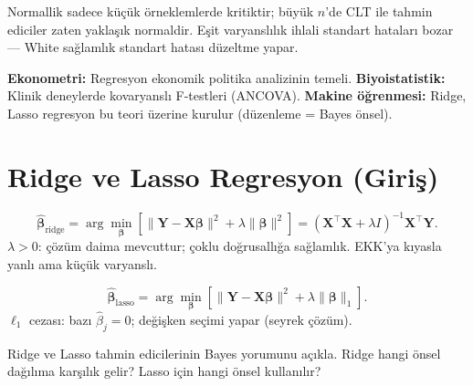 \begin{hataanalizi}
Normallik sadece küçük örneklemlerde kritiktir; büyük $n$'de CLT ile tahmin ediciler zaten yaklaşık normaldir. Eşit varyanslılık ihlali standart hataları bozar --- White sağlamlık standart hatası düzeltme yapar.
\end{hataanalizi}

\begin{disiplinlerarasibaglan}
\textbf{Ekonometri:} Regresyon ekonomik politika analizinin temeli. \textbf{Biyoistatistik:} Klinik deneylerde kovaryanslı F-testleri (ANCOVA). \textbf{Makine öğrenmesi:} Ridge, Lasso regresyon bu teori üzerine kurulur (düzenleme = Bayes önsel).
\end{disiplinlerarasibaglan}

\section{Ridge ve Lasso Regresyon (Giriş)}
\label{sec:ridge_lasso}

\begin{tanim}\label{def:ridge}
\[
  \hat{\boldsymbol{\beta}}_{\mathrm{ridge}} = \arg\min_{\boldsymbol\beta}\left[\|\mathbf{Y}-\mathbf{X}\boldsymbol\beta\|^2 + \lambda\|\boldsymbol\beta\|^2\right] = (\mathbf{X}^\top\mathbf{X}+\lambda I)^{-1}\mathbf{X}^\top\mathbf{Y}.
\]
$\lambda>0$: çözüm daima mevcuttur; çoklu doğrusallığa sağlamlık. EKK'ya kıyasla yanlı ama küçük varyanslı.
\end{tanim}

\begin{tanim}[Lasso]\label{def:lasso}
\[
  \hat{\boldsymbol{\beta}}_{\mathrm{lasso}} = \arg\min_{\boldsymbol\beta}\left[\|\mathbf{Y}-\mathbf{X}\boldsymbol\beta\|^2 + \lambda\|\boldsymbol\beta\|_1\right].
\]
$\ell_1$ cezası: bazı $\hat\beta_j=0$; değişken seçimi yapar (seyrek çözüm).
\end{tanim}

\begin{kendinleifade}
Ridge ve Lasso tahmin edicilerinin Bayes yorumunu açıkla. Ridge hangi önsel dağılıma karşılık gelir? Lasso için hangi önsel kullanılır?
\end{kendinleifade}

